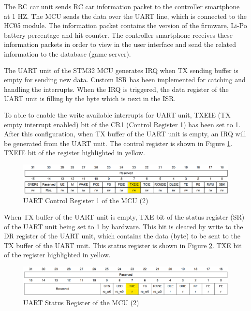 The RC car unit sends RC car information packet to the controller smartphone at 1 HZ. The MCU sends the data over the UART line, which is connected to the HC05 module. The information packet contains the version of the firmware, Li-Po battery percentage and hit counter. The controller smartphone receives these information packets in order to view in the user interface and send the related information to the database (game server).

The UART unit of the STM32 MCU generates IRQ when TX sending buffer is empty for sending new data. Custom ISR has been implemented for catching and handling the interrupts. When the IRQ is triggered, the data register of the UART unit is filling by the byte which is next in the ISR.

To able to enable the write available interrupts for UART unit, TXEIE (TX empty interrupt enabled) bit of the CR1 (Control Register 1) has been set to 1. After this configuration, when TX buffer of the UART unit is empty, an IRQ will be generated from the UART unit. The control register is shown in Figure \ref{fig:uart_cr_tx_register}. TXEIE bit of the register highlighted in yellow.

\begin{figure}[!htbp]
    \centering
    \includegraphics[width=1\textwidth]{Imgs/cr_tx_register.png}
    \caption{\label{fig:uart_cr_tx_register}UART Control Register 1 of the MCU (2) \cite{Ref_stm32_um}}
\end{figure}

When TX buffer of the UART unit is empty, TXE bit of the status register (SR) of the UART unit being set to 1 by hardware. This bit is cleared by write to the DR register of the UART unit, which contains the data (byte) to be sent to the TX buffer of the UART unit. This status register is shown in Figure \ref{fig:uart_sr_tx_register}. TXE bit of the register highlighted in yellow.

\begin{figure}[!htbp]
    \centering
    \includegraphics[width=1\textwidth]{Imgs/sr_tx_register.png}
    \caption{\label{fig:uart_sr_tx_register}UART Status Register of the MCU (2) \cite{Ref_stm32_um}}
\end{figure}


